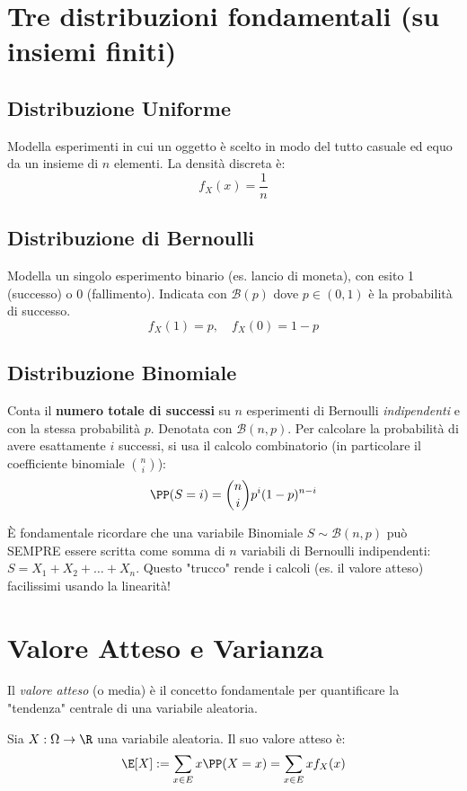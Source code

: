 \section{Tre distribuzioni fondamentali (su insiemi finiti)}

\subsection{Distribuzione Uniforme}
Modella esperimenti in cui un oggetto è scelto in modo del tutto casuale ed equo da un insieme di $n$ elementi.
La densità discreta è:
\[ f_X(x) = \frac{1}{n} \]

\subsection{Distribuzione di Bernoulli}
Modella un singolo esperimento binario (es. lancio di moneta), con esito 1 (successo) o 0 (fallimento).
Indicata con $\mathcal{B}(p)$ dove $p \in (0,1)$ è la probabilità di successo.
\[ f_X(1) = p, \quad f_X(0) = 1-p \]

\subsection{Distribuzione Binomiale}
Conta il \textbf{numero totale di successi} su $n$ esperimenti di Bernoulli \emph{indipendenti} e con la stessa probabilità $p$.
Denotata con $\mathcal{B}(n, p)$.
Per calcolare la probabilità di avere esattamente $i$ successi, si usa il calcolo combinatorio (in particolare il coefficiente binomiale $\binom{n}{i}$):
\[ \PP(S = i) = \binom{n}{i} p^i (1-p)^{n-i} \]

\begin{hint}[Binomiale = Somma di Bernoulli]
    È fondamentale ricordare che una variabile Binomiale $S \sim \mathcal{B}(n,p)$ può SEMPRE essere scritta come somma di $n$ variabili di Bernoulli indipendenti: $S = X_1 + X_2 + \dots + X_n$. Questo "trucco" rende i calcoli (es. il valore atteso) facilissimi usando la linearità!
\end{hint}

\section{Valore Atteso e Varianza}

Il \emph{valore atteso} (o media) è il concetto fondamentale per quantificare la "tendenza" centrale di una variabile aleatoria.

\begin{definition}
Sia $X : \Omega \to \R$ una variabile aleatoria. Il suo valore atteso è:
\[ \E[X] := \sum_{x \in E} x \PP(X = x) = \sum_{x \in E} x f_X(x) \]
\end{definition}

